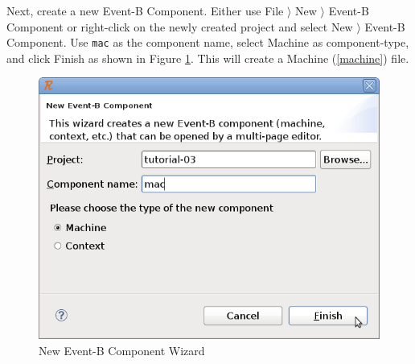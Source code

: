 
Next, create a new Event-B Component.  Either use \textsf{File $\rangle$ New $\rangle$ Event-B Component} or right-click on the newly created project and select \textsf{New $\rangle$ Event-B Component}.  Use \texttt{mac} as the component name, select \textsf{Machine} as component-type, and click \textsf{Finish} as shown in Figure \ref{fig_tut_03_new_component_wizard}. This will create a Machine (\ref{machine}) file.

\begin{figure}[!ht]
\begin{center}
	\includegraphics[]{img/tutorial/tut_03_mac.png}
	\caption{New Event-B Component Wizard}
	\label{fig_tut_03_new_component_wizard}
\end{center}
\end{figure}

